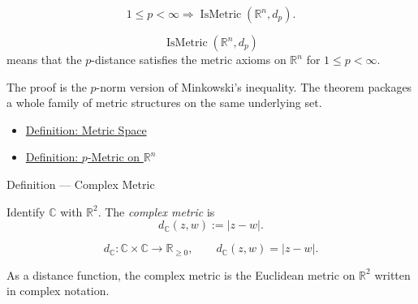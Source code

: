 \begin{remark*}
\[
1\leq p<\infty
\Longrightarrow
\operatorname{IsMetric}(\mathbb{R}^n,d_p).
\]
\end{remark*}

\begin{remark*}
\[
\operatorname{IsMetric}(\mathbb{R}^n,d_p)
\]
means that the \(p\)-distance satisfies the metric axioms on \(\mathbb{R}^n\)
for \(1\leq p<\infty\).
\end{remark*}

\begin{remark*}[Interpretation]
The proof is the \(p\)-norm version of Minkowski's inequality.  The theorem
packages a whole family of metric structures on the same underlying set.
\end{remark*}

\begin{dependencies}
\begin{itemize}
  \item \hyperref[def:metric-space]{Definition: Metric Space}
  \item \hyperref[def:lp-metric-rn]{Definition: \(p\)-Metric on \(\mathbb{R}^n\)}
\end{itemize}
\end{dependencies}

\begin{definitionbox}{Definition --- Complex Metric}
\begin{definition}\label{def:complex-metric}
Identify \(\mathbb{C}\) with \(\mathbb{R}^2\).  The \emph{complex metric} is
\[
  d_{\mathbb{C}}(z,w):=|z-w|.
\]
\end{definition}
\end{definitionbox}

\begin{remark*}
\[
d_{\mathbb{C}}:\mathbb{C}\times\mathbb{C}\to\mathbb{R}_{\geq 0},
\qquad
d_{\mathbb{C}}(z,w)=|z-w|.
\]
\end{remark*}

\begin{remark*}[Interpretation]
As a distance function, the complex metric is the Euclidean metric on
\(\mathbb{R}^2\) written in complex notation.
\end{remark*}


\DefinitionalRoot

